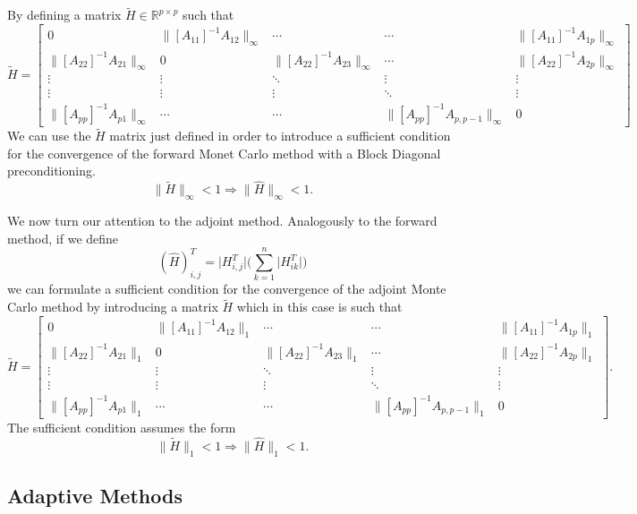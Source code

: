 By defining a matrix $\tilde{H}\in \mathbb{R}^{p\times p}$ such that
\[
 \tilde{H}=\begin{bmatrix}0 & \lVert [A_{11}]^{-1}A_{12}\rVert_{\infty} &
\cdots &
\cdots & \lVert [A_{11}]^{-1}A_{1p}\rVert_{\infty} \\
\lVert [A_{22}]^{-1}A_{21}\rVert_{\infty} & 0 & \lVert
[A_{22}]^{-1}A_{23}\rVert_{\infty} &
\cdots & \lVert [A_{22}]^{-1}A_{2p}\rVert_{\infty} \\
\vdots & \vdots & \ddots & \vdots & \vdots\\
\vdots & \vdots & \vdots &\ddots & \vdots \\
\lVert [A_{pp}]^{-1}A_{p1}\rVert_{\infty} &  \cdots & \cdots&
\lVert [A_{pp}]^{-1}A_{p,p-1}\rVert_{\infty} & 0
\end{bmatrix}
\]
We can use the $\tilde{H}$ matrix just defined in order to introduce a
sufficient condition for the convergence of the forward Monet Carlo method with
a Block Diagonal preconditioning.
\begin{equation}
 \lVert \tilde{H} \rVert_{\infty}<1 \Rightarrow \lVert \hat{H}
\rVert_{\infty}<1.
\end{equation}

We now turn our attention to the adjoint method.
Analogously to the forward method, if we define
\[
(\hat{H})^T_{i,j} = \lvert H^T_{i,j}\rvert\bigg(\sum_{k=1}^n\lvert
H^T_{ik}\rvert\bigg)
\]
we can formulate a sufficient condition for the convergence of the adjoint
Monte
Carlo method by introducing a matrix $\tilde{H}$ which in this case is such that
\[
  \tilde{H}=\begin{bmatrix}0 & \lVert [A_{11}]^{-1}A_{12}\rVert_{1} & \cdots
&
\cdots & \lVert [A_{11}]^{-1}A_{1p}\rVert_{1} \\
\lVert [A_{22}]^{-1}A_{21}\rVert_{1} & 0 & \lVert
[A_{22}]^{-1}A_{23}\rVert_{1} &
\cdots & \lVert [A_{22}]^{-1}A_{2p}\rVert_{1} \\
\vdots & \vdots & \ddots & \vdots & \vdots\\
\vdots & \vdots & \vdots &\ddots & \vdots \\
\lVert [A_{pp}]^{-1}A_{p1}\rVert_{1} &  \cdots & \cdots&
\lVert [A_{pp}]^{-1}A_{p,p-1}\rVert_{1} & 0
\end{bmatrix}.
\]
The sufficient condition assumes the form
\begin{equation}
 \lVert \tilde{H} \rVert_{1}<1 \Rightarrow \lVert \hat{H} \rVert_{1}<1.
\end{equation}

\subsection{Adaptive Methods}

